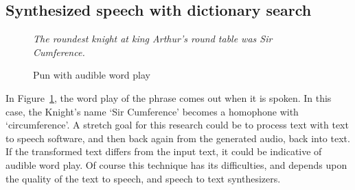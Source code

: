 \subsection{Synthesized speech with dictionary search}
\begin{figure}[h]
\begin{mdframed}
  \emph{The roundest knight at king Arthur's round table was Sir Cumference.}
  \caption{Pun with audible word play}
 \label{sircumference}
\end{mdframed}
\end{figure}

In Figure~\ref{sircumference}, the word play of the phrase comes out when it is spoken. In this case, the Knight's name `Sir Cumference' becomes a homophone with `circumference'.
A stretch goal for this research could be to process text with text to speech software, and then back again from the generated audio, back into text. If the transformed text
differs from the input text, it could be indicative of audible word play. Of course this technique has its difficulties, and depends upon the quality of the text to speech, and speech to text synthesizers.


